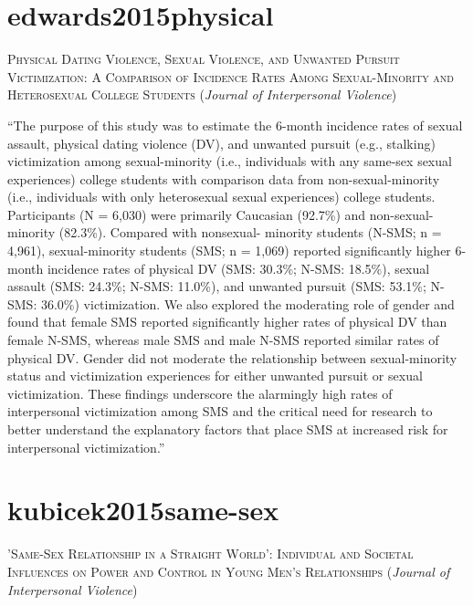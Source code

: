 \documentclass[]{tufte-handout}
\begin{document}
\section{\texorpdfstring{\textcolor[HTML]{5b0057}{edwards2015physical}}{}}\label{section-56}

\textsc{\large{Physical Dating Violence, Sexual Violence, and Unwanted Pursuit Victimization: A Comparison of Incidence Rates Among Sexual-Minority and Heterosexual College Students}}
(\emph{Journal of Interpersonal Violence})

``The purpose of this study was to estimate the 6-month incidence rates
of sexual assault, physical dating violence (DV), and unwanted pursuit
(e.g., stalking) victimization among sexual-minority (i.e., individuals
with any same-sex sexual experiences) college students with comparison
data from non-sexual-minority (i.e., individuals with only heterosexual
sexual experiences) college students. Participants (N = 6,030) were
primarily Caucasian (92.7\%) and non-sexual-minority (82.3\%). Compared
with nonsexual- minority students (N-SMS; n = 4,961), sexual-minority
students (SMS; n = 1,069) reported significantly higher 6-month
incidence rates of physical DV (SMS: 30.3\%; N-SMS: 18.5\%), sexual
assault (SMS: 24.3\%; N-SMS: 11.0\%), and unwanted pursuit (SMS: 53.1\%;
N-SMS: 36.0\%) victimization. We also explored the moderating role of
gender and found that female SMS reported significantly higher rates of
physical DV than female N-SMS, whereas male SMS and male N-SMS reported
similar rates of physical DV. Gender did not moderate the relationship
between sexual-minority status and victimization experiences for either
unwanted pursuit or sexual victimization. These findings underscore the
alarmingly high rates of interpersonal victimization among SMS and the
critical need for research to better understand the explanatory factors
that place SMS at increased risk for interpersonal victimization.''

\section{\texorpdfstring{\textcolor[HTML]{5b0057}{kubicek2015same-sex}}{}}\label{section-57}

\textsc{\large{'Same-Sex Relationship in a Straight World': Individual and Societal Influences on Power and Control in Young Men's Relationships}}
(\emph{Journal of Interpersonal Violence})
\end{document}

